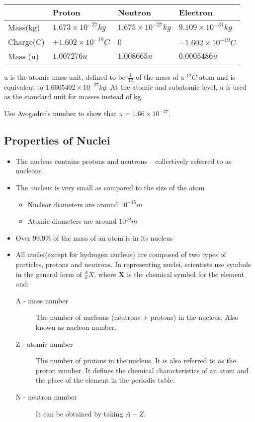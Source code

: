  \begin{tabular}{| l | l | l | l |}
 \hline
  & Proton & Neutron & Electron \\ \hline
 Mass(kg) & $1.673 \times 10^{-27}kg$ & $1.675 \times 10^{-27} kg$ & $9.109 \times 10^{-31}kg$\\ \hline
 Charge(C) & $+1.602 \times 10^{-19}C$ & 0 & $-1.602 \times 10^{-19}C$ \\ \hline
 Mass (u) & $1.007276 u$ & $1.008665u$ & $0.0005486u$ \\ \hline
 \end{tabular}
 
 u is the atomic mass unit, defined to be $\frac{1}{12}$ of the mass of a $^{12}C$ atom and is equivalent to $1.6605402 \times 10^{-27} kg $. At the atomic and subatomic level, u is used as the standard unit for masses instead of kg.
 
 Use Avogadro's number to show that $u= 1.66 \times 10^{-27}$.

\subsection{Properties of Nuclei}
\begin{itemize}
\item The nucleus contains protons and neutrons -- collectively referred to as nucleons
\item The nucleus is very small as compared to the size of the atom
\begin{itemize}
\item Nuclear diameters  are around $10^{-15} m$
\item Atomic diameters  are around $10^{10} m$
\end{itemize}
\item Over 99.9\% of the mass of an atom is in its nucleus
\item All nuclei(except for hydrogen nucleus) are composed of two types of particles, protons and neutrons. In representing nuclei, scientists use symbols in the general form of $^A_Z X$, where \textbf{X} is the chemical symbol for the element and:
\begin{description}
\item[A - mass number] The number of nucleons (neutrons $+$ protons) in the nucleus. Also known as nucleon number.
\item[Z - atomic number] The number of protons in the nucleus. It is also referred to as the proton number. It defines the chemical characteristics of an atom and the place of the element in the periodic table.
\item[N - neutron number] It can be obtained by taking $A - Z$.
\end{description}
\end{itemize}
